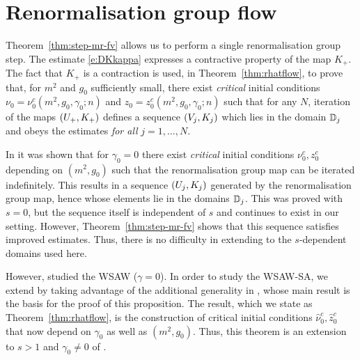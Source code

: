 
\section{Renormalisation group flow}

Theorem~\ref{thm:step-mr-fv} allows us to perform a single renormalisation group
step. The estimate \eqref{e:DKkappa} expresses a contractive property of the map
$K_+$. The fact that $K_+$ is a contraction is used, in Theorem~\ref{thm:rhatflow},
to prove that, for $m^2$ and $g_0$ sufficiently small, there exist
\emph{critical} initial conditions
$\nu_0 = \nu_0^c(m^2, g_0, \gamma_0; n)$ and $z_0 = z_0^c(m^2, g_0,\gamma_0; n)$
such that for any $N$,
iteration of the maps $(U_+,K_+)$ defines a sequence $(V_j, K_j)$
which lies in the domain $\mathbb{D}_j$ and obeys the estimates 
\emph{for all} $j = 1, \ldots, N$.

In \cite[Proposition~\ref{log-prop:flow-flow}]{BBS-saw4-log} it was shown
that for $\gamma_0 = 0$ there exist \emph{critical} initial conditions
$\nu_0^c, z_0^c$ depending on $(m^2, g_0)$ such that the renormalisation group
map can be iterated indefinitely. This
results in a sequence $(U_j, K_j)$ generated by the renormalisation group map, hence
whose elements lie in the domains $\mathbb{D}_j$. This was proved with $s = 0$,
but the sequence itself is independent of $s$ and continues to exist in our
setting. However, Theorem~\ref{thm:step-mr-fv} shows that this sequence satisfies
improved estimates. Thus, there is no difficulty in extending
\cite[Proposition~\ref{log-prop:flow-flow}]{BBS-saw4-log} to the $s$-dependent
domains used here.

However, \cite{BBS-saw4-log} studied the WSAW ($\gamma = 0$). In order to study
the WSAW-SA, we extend \cite[Proposition~\ref{log-prop:flow-flow}]{BBS-saw4-log}
by taking advantage of the additional generality in \cite{BBS-rg-flow}, whose
main result is the basis for the proof of this proposition. The result, which we
state as Theorem~\ref{thm:rhatflow}, is the
construction of critical initial conditions $\hat\nu_0^c, \hat z_0^c$ that now
depend on $\gamma_0$ as well as $(m^2, g_0)$. Thus, this theorem is an extension
to $s > 1$ and $\gamma_0 \ne 0$ of \cite[Proposition~\ref{log-prop:flow-flow}]{BBS-saw4-log}.


